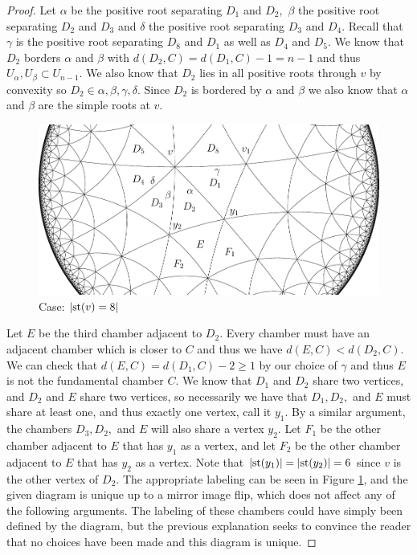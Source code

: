 \documentclass[class=book, crop=false]{standalone}
\begin{document}
\begin{proof}
	Let $\alpha$ be the positive root separating $D_1$ and $D_2,$ $\beta$ the positive root separating $D_2$ and $D_3$ and $\delta$ the positive root separating $D_3$ and $D_4.$ Recall that $\gamma$ is the positive root separating $D_8$ and $D_1$ as well as $D_4$ and $D_5.$ We know that $D_2$ borders $\alpha$ and $\beta$ with $d(D_2,C)=d(D_1,C)-1=n-1$ and thus $U_\alpha,U_\beta\subset U_{n-1}.$ We also know that $D_2$ lies in all positive roots through $v$ by convexity so $D_2\in \alpha,\beta,\gamma,\delta.$ Since $D_2$ is bordered by $\alpha$ and $\beta$ we also know that $\alpha$ and $\beta$ are the simple roots at $v.$
	\begin{figure}[h]
		\label{fig:334deg8}
	\begin{center}
		\includegraphics{diagrams/deg8433f2.pdf}
	\end{center}
	\caption{Case: $|\mathrm{st}(v)=8|$}
\end{figure}

Let $E$ be the third chamber adjacent to $D_2.$ Every chamber must have an adjacent chamber which is closer to $C$ and thus we have $d(E,C)<d(D_2,C).$ We can check that $d(E,C)=d(D_1,C)-2\ge 1$ by our choice of $\gamma$ and thus $E$ is not the fundamental chamber $C.$ We know that $D_1$ and $D_2$ share two vertices, and $D_2$ and $E$ share two vertices, so necessarily we have that $D_1,D_2,$ and $E$ must share at least one, and thus exactly one vertex, call it $y_1.$ By a similar argument, the chambers $D_3,D_2,$ and $E$ will also share a vertex $y_2.$ Let $F_1$ be the other chamber adjacent to $E$ that has $y_1$ as a vertex, and let $F_2$ be the other chamber adjacent to $E$ that has $y_2$ as a vertex. Note that $|\mathrm{st}(y_1)|=|\mathrm{st}(y_2)|=6$ since $v$ is the other vertex of $D_2.$ The appropriate labeling can be seen in Figure \ref{fig:334deg8}, and the given diagram is unique up to a mirror image flip, which does not affect any of the following arguments. The labeling of these chambers could have simply been defined by the diagram, but the previous explanation seeks to convince the reader that no choices have been made and this diagram is unique.


\end{proof}
\end{document}
